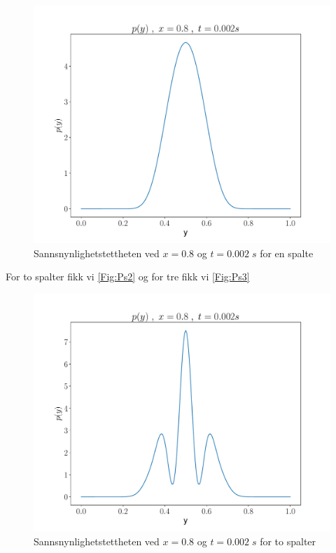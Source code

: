 \documentclass[reprint,english,notitlepage]{revtex4-2}  %
\begin{document}
\begin{figure}
\centering
\includegraphics[scale=0.4]{../Images/ScreenProb1Slit.pdf}
\caption{Sannsnynlighetstettheten ved $x = 0.8$ og $t = 0.002 \; s$ for en spalte}
\label{Fig:Ps1}
\end{figure}

For to spalter fikk vi \autoref{Fig:Ps2} og for tre fikk vi \autoref{Fig:Ps3}


\begin{figure}
\centering
\includegraphics[scale=0.4]{../Images/ScreenProb2Slit.pdf}
\caption{Sannsnynlighetstettheten ved $x = 0.8$ og $t = 0.002 \; s$ for to spalter}
\label{Fig:Ps1}
\end{figure}
\end{document}
